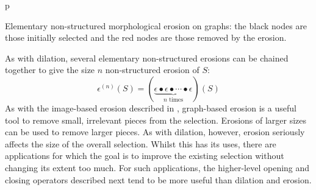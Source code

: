 \begin{stusubfig}{p}
	\hspace{4mm}%
\caption[Elementary non-structured morphological erosion on graphs]{Elementary non-structured morphological erosion on graphs: the black nodes are those initially selected and the red nodes are those removed by the erosion.}
\label{fig:featureid-techniques-erosion}
\end{stusubfig}

As with dilation, several elementary non-structured erosions can be chained together to give the size $n$ non-structured erosion of $S$:
%
\[
\epsilon^{(n)}(S) = (\underbrace{\epsilon \bullet \epsilon \bullet \cdots \bullet \epsilon}_{n \mbox{ times}})(S)
\]
%
As with the image-based erosion described in \cite{gonzalez02}, graph-based erosion is a useful tool to remove small, irrelevant pieces from the selection. Erosions of larger sizes can be used to remove larger pieces. As with dilation, however, erosion seriously affects the size of the overall selection. Whilst this has its uses, there are applications for which the goal is to improve the existing selection without changing its extent too much. For such applications, the higher-level opening and closing operators described next tend to be more useful than dilation and erosion.

